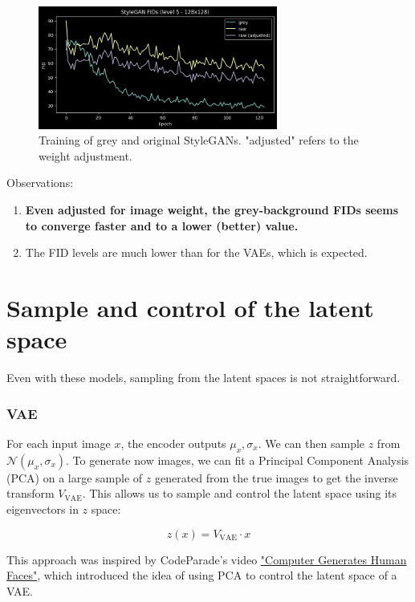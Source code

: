 \documentclass{article}
\begin{document}
\begin{figure}[H]
    \centering
    \includegraphics[width=0.7\textwidth]{images/stylegan_fids.png}
    \caption{Training of grey and original StyleGANs. "adjusted" refers to the weight adjustment.}
\end{figure}

Observations:
\begin{enumerate}
  \item \textbf{Even adjusted for image weight, the grey-background FIDs seems to converge faster and to a lower (better) value.}
  \item The FID levels are much lower than for the VAEs, which is expected.
\end{enumerate}

\section{Sample and control of the latent space}

Even with these models, sampling from the latent spaces is not straightforward.

\subsubsection*{VAE}

For each input image $x$, the encoder outputs $\mu_x, \sigma_x$. We can then sample $z$ from $\mathcal{N}(\mu_x, \sigma_x)$.
To generate now images, we can fit a Principal Component Analysis (PCA) on a large sample of $z$ generated from the true images to get the inverse transform $V_{\text{VAE}}$.
This allows us to sample and control the latent space using its eigenvectors in $z$ space:

\[z(x) = V_{\text{VAE}} \cdot x\]

This approach was inspired by CodeParade's video \href{https://www.youtube.com/watch?v=4VAkrUNLKSo}{"Computer Generates Human Faces"}, which introduced the idea of using PCA to control the latent space of a VAE.
\end{document}
